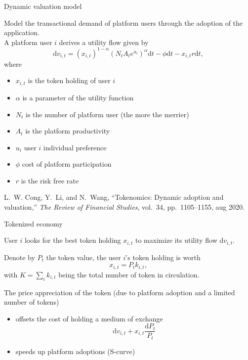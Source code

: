 \documentclass{beamer}
\begin{document}
\begin{frame}{Dynamic valuation model}
\scriptsize

Model the transactional demand of platform users through the adoption of the application. \\

A platform user $i$ derives a utility flow given by 
$$
\text{d}v_{i,t} = (x_{i,t})^{1-\alpha}\left(N_tA_te^{u_i}\right)^\alpha\text{d}t - \phi\text{d}t - x_{i,t}r\text{d}t,
$$
where
\begin{itemize}
  \item $x_{i,t}$ is the token holding of user $i$
  \item $\alpha$ is a parameter of the utility function
  \item $N_t$ is the number of platform user (the more the merrier)
  \item $A_t$ is the platform productivity
  \item $u_i$ user $i$ individual preference 
  \item $\phi$ cost of platform participation
  \item $r$ is the risk free rate
\end{itemize}
\tiny
\begin{thebibliography}{1}

L.~W. Cong, Y.~Li, and N.~Wang, ``Tokenomics: Dynamic adoption and valuation,''
  {\em The Review of Financial Studies}, vol.~34, pp.~1105--1155, aug 2020.

\end{thebibliography}

\end{frame}
\begin{frame}{Tokenized economy}
\scriptsize
\begin{tcolorbox}[enhanced,drop shadow, title=Fact]
User $i$ looks for the best token holding $x_{i,t}$ to maximize its utility flow $\text{d}v_{i,t}$.

\end{tcolorbox}
Denote by $P_t$ the token value, the user $i$'s token holding is worth
$$
x_{i,t} = P_t k_{i,t},
$$
with $K =  \sum_i k_{i,t}$ being the total number of token in circulation. \\
\begin{tcolorbox}[enhanced,drop shadow, title=Theorem]

The price appreciation of the token (due to platform adoption and a limited number of tokens)
\begin{itemize}
\item  offsets the cost of holding a medium of exchange 
$$
\text{d}v_{i,t} + x_{i,t}\frac{\text{d}P_t}{P_t}
$$
\item speeds up platform adoptions (S-curve)
\end{itemize}

\end{tcolorbox}
\end{frame}
\end{document}
